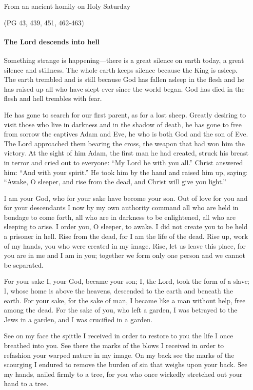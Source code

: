 From an ancient homily on Holy Saturday

\par \hfill(PG 43, 439, 451, 462-463)

\paragraph{The Lord descends into hell}

\lettrine[lines=3]{S}{}omething strange is happening—there is a great silence on earth today, a great silence and stillness. The whole earth keeps silence because the King is asleep. The earth trembled and is still because God has fallen asleep in the flesh and he has raised up all who have slept ever since the world began. God has died in the flesh and hell trembles with fear.

He has gone to search for our first parent, as for a lost sheep. Greatly desiring to visit those who live in darkness and in the shadow of death, he has gone to free from sorrow the captives Adam and Eve, he who is both God and the son of Eve. The Lord approached them bearing the cross, the weapon that had won him the victory. At the sight of him Adam, the first man he had created, struck his breast in terror and cried out to everyone: “My Lord be with you all.” Christ answered him: “And with your spirit.” He took him by the hand and raised him up, saying: “Awake, O sleeper, and rise from the dead, and Christ will give you light.”

I am your God, who for your sake have become your son. Out of love for you and for your descendants I now by my own authority command all who are held in bondage to come forth, all who are in darkness to be enlightened, all who are sleeping to arise. I order you, O sleeper, to awake. I did not create you to be held a prisoner in hell. Rise from the dead, for I am the life of the dead. Rise up, work of my hands, you who were created in my image. Rise, let us leave this place, for you are in me and I am in you; together we form only one person and we cannot be separated.

For your sake I, your God, became your son; I, the Lord, took the form of a slave; I, whose home is above the heavens, descended to the earth and beneath the earth. For your sake, for the sake of man, I became like a man without help, free among the dead. For the sake of you, who left a garden, I was betrayed to the Jews in a garden, and I was crucified in a garden.

See on my face the spittle I received in order to restore to you the life I once breathed into you. See there the marks of the blows I received in order to refashion your warped nature in my image. On my back see the marks of the scourging I endured to remove the burden of sin that weighs upon your back. See my hands, nailed firmly to a tree, for you who once wickedly stretched out your hand to a tree.

